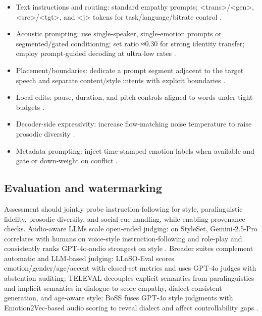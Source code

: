 \documentclass{article}
\begin{document}
\begin{itemize}
\item Text instructions and routing: standard empathy prompts; <trans>/<gen>, <src>/<tgt>, and <j> tokens for task/language/bitrate control \cite{wang2024blspemotowardsempatheticlargespeechlangu,peng2024mslms2stmultitaskspeechlanguagemodeltext}.
\item Acoustic prompting: use single‑speaker, single‑emotion prompts or segmented/gated conditioning; set ratio ≈0.30 for strong identity transfer; employ prompt‑guided decoding at ultra‑low rates \cite{peng2024empiricalstudyspeechlanguagemodelsprompt,gong2024seamlessexpressivelmspeechlanguagemodele,wang2025tadicodectextawarediffusionspeechtokeniz}.
\item Placement/boundaries: dedicate a prompt segment adjacent to the target speech and separate content/style intents with explicit boundaries \cite{wu2024speechcomposerunifyingmultiplespeechtask}.
\item Local edits: pause, duration, and pitch controls aligned to words under tight budgets \cite{huang2023holisticcascadesystembenchmarkhumanevalu}.
\item Decoder‑side expressivity: increase flow‑matching noise temperature to raise prosodic diversity \cite{yuan2024continuousspeechtokensmakesllmsrobustmul}.
\item Metadata prompting: inject time‑stamped emotion labels when available and gate or down‑weight on conflict \cite{wang2025incorporatingcontextualparalinguisticund}.
\end{itemize}

\subsection{Evaluation and watermarking} \label{subsec:Evaluation and watermarking}
Assessment should jointly probe instruction‑following for style, paralinguistic fidelity, prosodic diversity, and social cue handling, while enabling provenance checks. Audio‑aware LLMs scale open‑ended judging: on StyleSet, Gemini‑2.5‑Pro correlates with humans on voice‑style instruction‑following and role‑play and consistently ranks GPT‑4o‑audio strongest on style \cite{chiang2025audioawarelargelanguagemodelsasjudgesspe}. Broader suites complement automatic and LLM‑based judging: LLaSO‑Eval scores emotion/gender/age/accent with closed‑set metrics and uses GPT‑4o judges with abstention auditing; TELEVAL decouples explicit semantics from paralinguistics and implicit semantics in dialogue to score empathy, dialect‑consistent generation, and age‑aware style; BoSS fuses GPT‑4o style judgments with Emotion2Vec‑based audio scoring to reveal dialect and affect controllability gaps \cite{sun2025llasofoundationalframeworkreproduciblere,li2025televaldynamicbenchmarkdesignedspokenlan,wang2025bossbeyondsemanticspeech}. 
\end{document}
